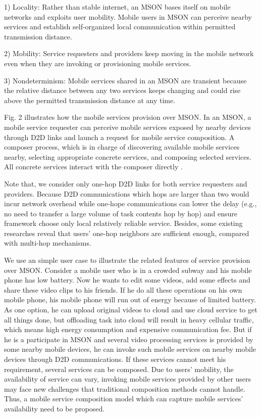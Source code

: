 \documentclass[10pt,journal,compsoc]{IEEEtran}
\begin{document}
1) Locality: Rather than stable internet, an MSON bases itself on mobile networks and exploits user mobility. Mobile users in MSON can perceive nearby services and establish self-organized local communication within permitted transmission distance.

2) Mobility: Service requesters and providers keep moving in the mobile network even when they are invoking or provisioning mobile services.

3) Nondeterminism: Mobile services shared in an MSON are transient because the relative distance between any two services keeps changing and could rise above the permitted transmission distance at any time. 

Fig. 2 illustrates how the mobile services provision over MSON. In an MSON, a mobile service requester can perceive mobile services exposed by nearby devices through D2D links and launch a request for mobile service composition. A composer process, which is in charge of discovering available mobile services nearby, selecting appropriate concrete services, and composing selected services. All concrete services interact with the composer directly \cite{Deng2017}.

Note that, we consider only one-hop D2D links for both service requesters and providers. 
Because D2D communications which hops are larger than two would incur network overhead \cite{li2014can} while one-hope communications can lower the delay (e.g., no need to transfer a large volume of task contents hop by hop) and ensure framework choose only local relatively reliable service. 
Besides, some existing researches \cite{chang2015progressive,tuncay2013participant,wu2013homing,jiang2016exploiting,liu2013exploring} reveal that users' one-hop neighbors are sufficient enough, compared with multi-hop mechanisms.

We use an simple user case to illustrate the related features of service provision over MSON. 
Consider a mobile user who is in a crowded subway and his mobile phone has low battery. 
Now he wants to edit some videos, add some effects and share these video clips to his friends. 
If he do all these operations on his own mobile phone, his mobile phone will run out of energy because of limited battery. 
As one option, he can upload original videos to cloud and use cloud service to get all things done, but offloading task into cloud will result in heavy cellular traffic, which means high energy consumption and expensive communication fee.
But if he is a participate in MSON and several video processing services is provided by some nearby mobile devices, he can invoke such mobile services on nearby mobile devices through D2D communications. 
If these services cannot meet his requirement, several services can be composed. 
Due to users' mobility, the availability of service can vary, invoking mobile services provided by other users may face new challenges that traditional composition methods cannot handle. 
Thus, a mobile service composition model which can capture mobile services' availability need to be proposed.
\end{document}
